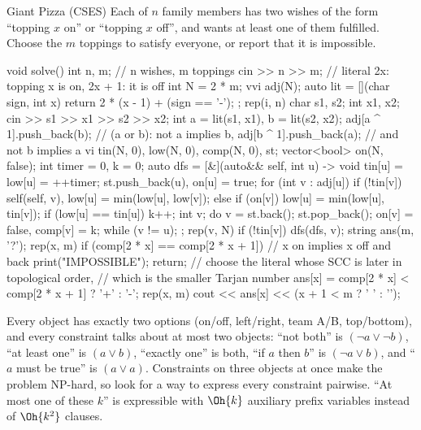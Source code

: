 \begin{problem}{Giant Pizza (CSES)}
Each of $n$ family members has two wishes of the form ``topping $x$ on'' or ``topping $x$ off'', and wants at least one of them
fulfilled. Choose the $m$ toppings to satisfy everyone, or report that it is impossible.
\end{problem}

\begin{code}
void solve() {
    int n, m;  // n wishes, m toppings
    cin >> n >> m;
    // literal 2x: topping x is on, 2x + 1: it is off
    int N = 2 * m;
    vvi adj(N);
    auto lit = [](char sign, int x) { return 2 * (x - 1) + (sign == '-'); };
    rep(i, n) {
        char s1, s2;
        int x1, x2;
        cin >> s1 >> x1 >> s2 >> x2;
        int a = lit(s1, x1), b = lit(s2, x2);
        adj[a ^ 1].push_back(b);  // (a or b): not a implies b,
        adj[b ^ 1].push_back(a);  // and not b implies a
    }
    vi tin(N, 0), low(N, 0), comp(N, 0), st;
    vector<bool> on(N, false);
    int timer = 0, k = 0;
    auto dfs = [&](auto&& self, int u) -> void {
        tin[u] = low[u] = ++timer;
        st.push_back(u), on[u] = true;
        for (int v : adj[u]) {
            if (!tin[v]) self(self, v), low[u] = min(low[u], low[v]);
            else if (on[v]) low[u] = min(low[u], tin[v]);
        }
        if (low[u] == tin[u]) {
            k++;
            int v;
            do {
                v = st.back();
                st.pop_back();
                on[v] = false, comp[v] = k;
            } while (v != u);
        }
    };
    rep(v, N) if (!tin[v]) dfs(dfs, v);
    string ans(m, '?');
    rep(x, m) {
        if (comp[2 * x] == comp[2 * x + 1]) {  // x on implies x off and back
            print("IMPOSSIBLE");
            return;
        }
        // choose the literal whose SCC is later in topological order,
        // which is the smaller Tarjan number
        ans[x] = comp[2 * x] < comp[2 * x + 1] ? '+' : '-';
    }
    rep(x, m) cout << ans[x] << (x + 1 < m ? ' ' : '\n');
}
\end{code}


\begin{recognize}
Every object has exactly two options (on/off, left/right, team A/B, top/bottom), and every constraint talks about at most two
objects: ``not both'' is $(\lnot a \lor \lnot b)$, ``at least one'' is $(a \lor b)$, ``exactly one'' is both, ``if $a$ then
$b$'' is $(\lnot a \lor b)$, and ``$a$ must be true'' is $(a \lor a)$. Constraints on three objects at once make the problem
NP-hard, so look for a way to express every constraint pairwise. ``At most one of these $k$'' is expressible with $\Oh{k}$
auxiliary prefix variables instead of $\Oh{k^2}$ clauses.
\end{recognize}

